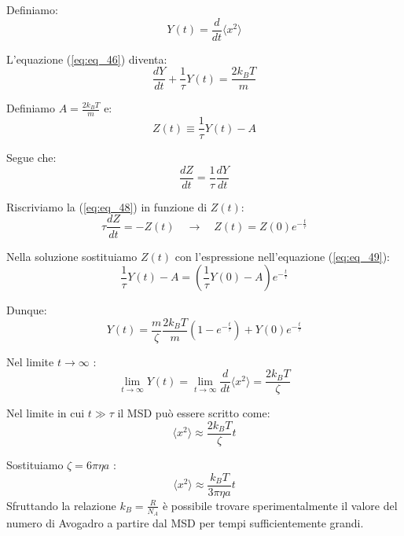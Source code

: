 Definiamo:
\begin{equation} 
Y(t) = \frac{d}{dt} \langle x^2 \rangle 
\end{equation}

L'equazione (\ref{eq:eq_46}) diventa:
\begin{equation} 
\frac{dY}{dt} + \frac{1}{\tau} Y(t) = \frac{2 k_B T}{m} 
\end{equation}

Definiamo $A=\frac{2 k_B T}{m}$ e:
\begin{equation} 
\label{eq:eq_48}
Z(t) \equiv \frac{1}{\tau} Y(t) - A 
\end{equation}

Segue che:
\begin{equation} 
\frac{dZ}{dt} = \frac{1}{\tau} \frac{dY}{dt}  
\end{equation}

Riscriviamo la (\ref{eq:eq_48}) in funzione di $Z(t)$:
\begin{equation} 
\label{eq:eq_49}
\tau \frac{dZ}{dt} = - Z(t)  \quad \rightarrow \quad Z(t)=Z(0) e^{-\frac{t}{\tau}}
\end{equation}

Nella soluzione sostituiamo $Z(t)$ con l'espressione nell'equazione (\ref{eq:eq_49}):
\begin{equation} 
\frac{1}{\tau} Y(t) - A = \left( \frac{1}{\tau} Y(0) - A \right) e^{-\frac{t}{\tau}} 
\end{equation}

Dunque:
\begin{equation} 
Y(t) = \frac{m}{\zeta} \frac{2 k_B T}{m} \left( 1-e^{-\frac{t}{\tau}}\right)+ Y(0) e^{-\frac{t}{\tau}}
\end{equation}

Nel limite $t \to \infty$ :
\begin{equation} 
\lim_{t \to \infty} Y(t) = \lim_{t \to \infty} \frac{d}{dt} \langle x^2 \rangle  = \frac{2 k_B T}{\zeta} 
\end{equation}

Nel limite in cui $t \gg \tau$ il MSD può essere scritto come:
\begin{equation}  
\langle x^2 \rangle  \approx \frac{2 k_B T}{\zeta} t
\end{equation}

Sostituiamo $\zeta = 6\pi \eta a$ :
\begin{equation}  
\langle x^2 \rangle  \approx \frac{ k_B T}{ 3 \pi \eta a} t
\end{equation}
Sfruttando la relazione $k_B = \frac{R}{N_A}$  è possibile trovare sperimentalmente il valore del numero di Avogadro a partire dal MSD per tempi sufficientemente grandi.

